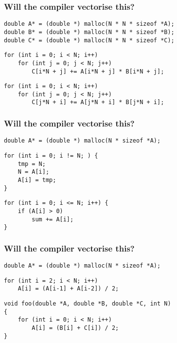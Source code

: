 \documentclass[14pt,aspectratio=169,dvipsnames,table]{beamer}
\begin{document}
\begin{frame}[fragile]
  \frametitle{Will the compiler vectorise this?}
\begin{lstlisting}
double A* = (double *) malloc(N * N * sizeof *A);
double B* = (double *) malloc(N * N * sizeof *B);
double C* = (double *) malloc(N * N * sizeof *C);
\end{lstlisting}
\begin{lstlisting}
for (int i = 0; i < N; i++)
    for (int j = 0; j < N; j++)
        C[i*N + j] += A[i*N + j] * B[i*N + j];
\end{lstlisting}
  \pause
\begin{lstlisting}
for (int i = 0; i < N; i++)
    for (int j = 0; j < N; j++)
        C[j*N + i] += A[j*N + i] * B[j*N + i];
\end{lstlisting}
\end{frame}





\begin{frame}[fragile]
  \frametitle{Will the compiler vectorise this?}
\begin{lstlisting}
double A* = (double *) malloc(N * sizeof *A);
\end{lstlisting}
\begin{lstlisting}
for (int i = 0; i != N; ) {
    tmp = N;
    N = A[i];
    A[i] = tmp;
}
\end{lstlisting}
  \pause
\begin{lstlisting}
for (int i = 0; i <= N; i++) {
    if (A[i] > 0)
        sum += A[i];
}
\end{lstlisting}
\end{frame}





\begin{frame}[fragile]
  \frametitle{Will the compiler vectorise this?}
\begin{lstlisting}
double A* = (double *) malloc(N * sizeof *A);
\end{lstlisting}
\begin{lstlisting}
for (int i = 2; i < N; i++)
    A[i] = (A[i-1] + A[i-2]) / 2;
\end{lstlisting}
  \pause
\begin{lstlisting}
void foo(double *A, double *B, double *C, int N)
{
    for (int i = 0; i < N; i++)
        A[i] = (B[i] + C[i]) / 2;
}
\end{lstlisting}

  \vskip 10pt

\end{frame}
\end{document}
